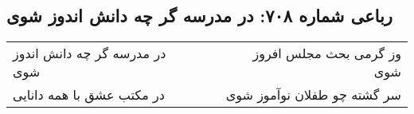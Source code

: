 \begin{center}
\section*{رباعی شماره ۷۰۸: در مدرسه گر چه دانش اندوز شوی}
\label{sec:sh708}
\begin{longtable}{l p{0.5cm} r}
در مدرسه گر چه دانش اندوز شوی
&&
وز گرمی بحث مجلس افروز شوی
\\
در مکتب عشق با همه دانایی
&&
سر گشته چو طفلان نوآموز شوی
\\
\end{longtable}
\end{center}
